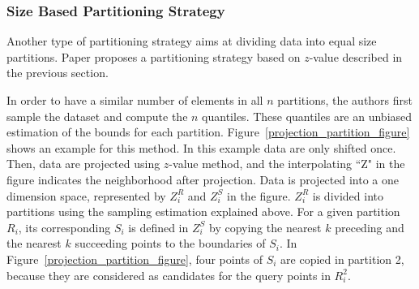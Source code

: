 \subsubsection{Size Based Partitioning Strategy} 

Another type of partitioning strategy aims at dividing data into equal size partitions. Paper \cite{Zhang:2012:EPK:2247596.2247602} proposes a partitioning strategy based on $z$-value described in the 
previous section. 

In order to have a similar number of elements in all $n$ partitions, the authors first sample the dataset and compute the $n$ quantiles. These quantiles are an  unbiased estimation of the bounds for each partition. Figure~\ref{projection_partition_figure} shows an example for this method. In this example data are only shifted once. Then, data are projected using $z$-value method, and the interpolating ``Z" in the figure indicates the neighborhood after projection. Data is projected into a one dimension space, represented by 
$Z_{i}^{R}$ and $Z_{i}^{S}$ in the figure. $Z_{i}^{R}$ is divided into partitions using the sampling estimation explained above. For a given partition $R_i$, its corresponding $S_i$ is defined in $Z_{i}^{S}$ by copying the nearest $k$ preceding and the nearest $k$ succeeding points to the boundaries of $S_i$.
In  Figure~\ref{projection_partition_figure}, four points of $S_i$ are copied in partition 2, because they are considered as candidates for the query points in $R_i^2$.

